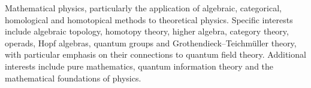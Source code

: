 



\begin{cvparagraph}
  Mathematical physics, particularly the application of algebraic, categorical, homological and homotopical methods to theoretical physics. Specific interests include algebraic topology, homotopy theory, higher algebra, category theory, operads, Hopf algebras, quantum groups and Grothendieck--Teichmüller theory, with particular emphasis on their connections to quantum field theory. Additional interests include pure mathematics, quantum information theory and the mathematical foundations of physics.
\end{cvparagraph}